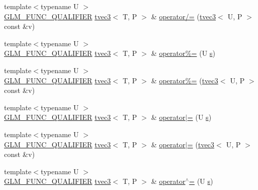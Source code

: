 \begin{DoxyCompactItemize}
\item 
{\footnotesize template$<$typename U $>$ }\\\hyperlink{setup_8hpp_a33fdea6f91c5f834105f7415e2a64407}{G\+L\+M\+\_\+\+F\+U\+N\+C\+\_\+\+Q\+U\+A\+L\+I\+F\+I\+ER} \hyperlink{structglm_1_1detail_1_1tvec3}{tvec3}$<$ T, P $>$ \& \hyperlink{structglm_1_1detail_1_1tvec3_aa8a3e4ddca435bf79743f2eaf7565258}{operator/=} (\hyperlink{structglm_1_1detail_1_1tvec3}{tvec3}$<$ U, P $>$ const \&v)
\item 
{\footnotesize template$<$typename U $>$ }\\\hyperlink{setup_8hpp_a33fdea6f91c5f834105f7415e2a64407}{G\+L\+M\+\_\+\+F\+U\+N\+C\+\_\+\+Q\+U\+A\+L\+I\+F\+I\+ER} \hyperlink{structglm_1_1detail_1_1tvec3}{tvec3}$<$ T, P $>$ \& \hyperlink{structglm_1_1detail_1_1tvec3_aaaf69a6d0cf17237a58eeb07b594c9a7}{operator\%=} (U \hyperlink{structglm_1_1detail_1_1tvec3_aa7906d8cd1a54c96ba22c1f97ebaf7cc}{s})
\item 
{\footnotesize template$<$typename U $>$ }\\\hyperlink{setup_8hpp_a33fdea6f91c5f834105f7415e2a64407}{G\+L\+M\+\_\+\+F\+U\+N\+C\+\_\+\+Q\+U\+A\+L\+I\+F\+I\+ER} \hyperlink{structglm_1_1detail_1_1tvec3}{tvec3}$<$ T, P $>$ \& \hyperlink{structglm_1_1detail_1_1tvec3_aa8a52f5d1ee2dc56c4b62f70408d9c5f}{operator\%=} (\hyperlink{structglm_1_1detail_1_1tvec3}{tvec3}$<$ U, P $>$ const \&v)
\item 
{\footnotesize template$<$typename U $>$ }\\\hyperlink{setup_8hpp_a33fdea6f91c5f834105f7415e2a64407}{G\+L\+M\+\_\+\+F\+U\+N\+C\+\_\+\+Q\+U\+A\+L\+I\+F\+I\+ER} \hyperlink{structglm_1_1detail_1_1tvec3}{tvec3}$<$ T, P $>$ \& \hyperlink{structglm_1_1detail_1_1tvec3_a019d5be6cb44504bcb2b91cedff0aed9}{operator$\vert$=} (U \hyperlink{structglm_1_1detail_1_1tvec3_aa7906d8cd1a54c96ba22c1f97ebaf7cc}{s})
\item 
{\footnotesize template$<$typename U $>$ }\\\hyperlink{setup_8hpp_a33fdea6f91c5f834105f7415e2a64407}{G\+L\+M\+\_\+\+F\+U\+N\+C\+\_\+\+Q\+U\+A\+L\+I\+F\+I\+ER} \hyperlink{structglm_1_1detail_1_1tvec3}{tvec3}$<$ T, P $>$ \& \hyperlink{structglm_1_1detail_1_1tvec3_a059fd49c5bed06205e0703683cbaf3e0}{operator$\vert$=} (\hyperlink{structglm_1_1detail_1_1tvec3}{tvec3}$<$ U, P $>$ const \&v)
\item 
{\footnotesize template$<$typename U $>$ }\\\hyperlink{setup_8hpp_a33fdea6f91c5f834105f7415e2a64407}{G\+L\+M\+\_\+\+F\+U\+N\+C\+\_\+\+Q\+U\+A\+L\+I\+F\+I\+ER} \hyperlink{structglm_1_1detail_1_1tvec3}{tvec3}$<$ T, P $>$ \& \hyperlink{structglm_1_1detail_1_1tvec3_a20e0ed2f3f08cc1028badb8b550ec746}{operator$^\wedge$=} (U \hyperlink{structglm_1_1detail_1_1tvec3_aa7906d8cd1a54c96ba22c1f97ebaf7cc}{s})

\end{DoxyCompactItemize}

